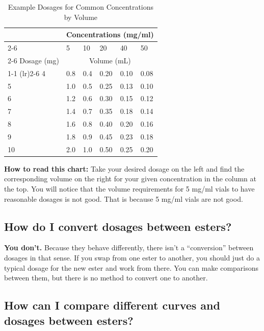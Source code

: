 \documentclass{article}
\begin{document}
\begin{table}
\centering
\caption{Example Dosages for Common Concentrations by Volume}
\label{tab:concentrations}
\begin{tabular}{@{}llllll@{}}
  \toprule
  \multicolumn{1}{c}{} & \multicolumn{5}{c}{Concentrations (mg/ml)} \\
  \cmidrule(rl){2-6}
            & 5    & 10  & 20 & 40 & 50   \\
            \cmidrule(rl){2-6}
Dosage (mg) & \multicolumn{5}{c}{Volume (mL)}  \\
    \cmidrule(r){1-1} \cmidrule(lr){2-6}
4        & 0.8  & 0.4 & 0.20  & 0.10 & 0.08\\
5        & 1.0    & 0.5 & 0.25 & 0.13 &  0.10\\
6        & 1.2  & 0.6   & 0.30  & 0.15 & 0.12   \\
7        & 1.4  & 0.7 & 0.35  & 0.18 & 0.14\\
8        & 1.6  & 0.8   & 0.40  & 0.20 & 0.16  \\
9        & 1.8  & 0.9 & 0.45  & 0.23 & 0.18\\
10       & 2.0    & 1.0   & 0.50  & 0.25 & 0.20 \\
  \bottomrule
\end{tabular}
\end{table}

\textbf{How to read this chart:} Take your desired dosage on the left and find the corresponding volume on the right for your given concentration in the column at the top. You will notice that the volume requirements for 5 mg/ml vials to have reasonable dosages is not good. That is because 5 mg/ml vials are not good.

\subsection{How do I convert dosages between esters?}

\textbf{You don’t.} Because they behave differently, there isn’t a “conversion” between dosages in that sense. If you swap from one ester to another, you should just do a typical dosage for the new ester and work from there. You can make comparisons between them, but there is no method to convert one to another.

\subsection{How can I compare different curves and dosages between esters?}
\end{document}
